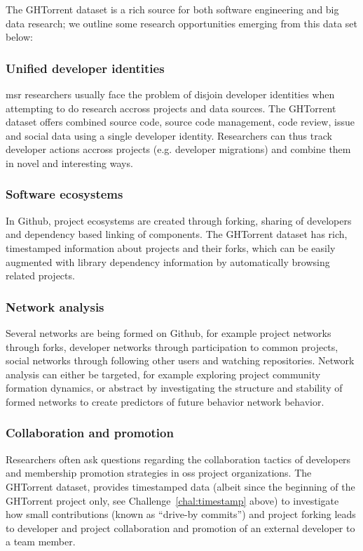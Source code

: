 \documentclass[conference]{IEEEtran}
\begin{document}
The GHTorrent dataset is a rich source for both software engineering and
big data research; we outline some research opportunities emerging from
this data set below:

\subsubsection{Unified developer identities} {\sc msr} researchers usually face the
problem of disjoin developer identities when attempting to do research accross
projects and data sources. The GHTorrent dataset offers
combined source code, source code management, code review, issue and social
data using a single developer identity. Researchers can thus track developer
actions accross projects (e.g. developer migrations) and combine them in 
novel and interesting ways. 

\subsubsection{Software ecosystems} In Github, project ecosystems are created
through forking, sharing of developers and dependency based linking of
components. The GHTorrent dataset has rich, timestamped information about 
projects and their forks, which can be easily augmented with library
dependency information by automatically browsing related projects.

\subsubsection{Network analysis} Several networks are being formed on
Github, for example project networks through forks, developer networks
through participation to common projects, social networks through following
other users and watching repositories. Network analysis can either
be targeted, for example exploring project community formation dynamics, or
abstract by investigating the structure and stability of formed networks to
create predictors of future behavior network behavior.

\subsubsection{Collaboration and promotion} Researchers often ask questions
regarding the collaboration tactics of developers and membership promotion
strategies in {\sc oss} project organizations.  The GHTorrent dataset,
provides timestamped data (albeit since the beginning of the GHTorrent
project only, see Challenge~\ref{chal:timestamp} above) to investigate
how small contributions (known as ``drive-by commits'') and project
forking leads to developer and project collaboration and promotion of an
external developer to a team member.
\end{document}
